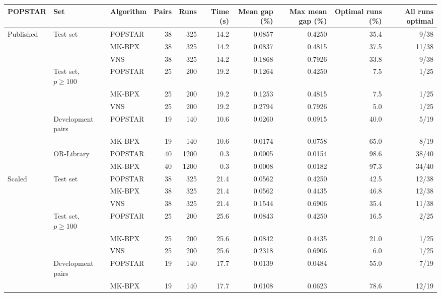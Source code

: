 \begin{tabular}{lllrrrrrrr}
\toprule
POPSTAR & Set & Algorithm & Pairs & Runs & Time (s) & Mean gap (\%) & Max mean gap (\%) & Optimal runs (\%) & All runs optimal \\
\midrule
Published & Test set & POPSTAR & 38 & 325 & 14.2 & 0.0857 & 0.4250 & 35.4 & 9/38 \\
 &  & MK-BPX & 38 & 325 & 14.2 & 0.0837 & 0.4815 & 37.5 & 11/38 \\
 &  & VNS & 38 & 325 & 14.2 & 0.1868 & 0.7926 & 33.8 & 9/38 \\
\addlinespace[2pt]
 & Test set, $p\geq 100$ & POPSTAR & 25 & 200 & 19.2 & 0.1264 & 0.4250 & 7.5 & 1/25 \\
 &  & MK-BPX & 25 & 200 & 19.2 & 0.1253 & 0.4815 & 7.5 & 1/25 \\
 &  & VNS & 25 & 200 & 19.2 & 0.2794 & 0.7926 & 5.0 & 1/25 \\
\addlinespace[2pt]
 & Development pairs & POPSTAR & 19 & 140 & 10.6 & 0.0260 & 0.0915 & 40.0 & 5/19 \\
 &  & MK-BPX & 19 & 140 & 10.6 & 0.0174 & 0.0758 & 65.0 & 8/19 \\
\addlinespace[2pt]
 & OR-Library & POPSTAR & 40 & 1200 & 0.3 & 0.0005 & 0.0154 & 98.6 & 38/40 \\
 &  & MK-BPX & 40 & 1200 & 0.3 & 0.0008 & 0.0182 & 97.3 & 34/40 \\
\midrule
Scaled & Test set & POPSTAR & 38 & 325 & 21.4 & 0.0562 & 0.4250 & 42.5 & 12/38 \\
 &  & MK-BPX & 38 & 325 & 21.4 & 0.0562 & 0.4435 & 46.8 & 12/38 \\
 &  & VNS & 38 & 325 & 21.4 & 0.1544 & 0.6906 & 35.4 & 11/38 \\
\addlinespace[2pt]
 & Test set, $p\geq 100$ & POPSTAR & 25 & 200 & 25.6 & 0.0843 & 0.4250 & 16.5 & 2/25 \\
 &  & MK-BPX & 25 & 200 & 25.6 & 0.0842 & 0.4435 & 21.0 & 1/25 \\
 &  & VNS & 25 & 200 & 25.6 & 0.2318 & 0.6906 & 6.0 & 1/25 \\
\addlinespace[2pt]
 & Development pairs & POPSTAR & 19 & 140 & 17.7 & 0.0139 & 0.0484 & 55.0 & 7/19 \\
 &  & MK-BPX & 19 & 140 & 17.7 & 0.0108 & 0.0623 & 78.6 & 12/19 \\
\bottomrule
\end{tabular}